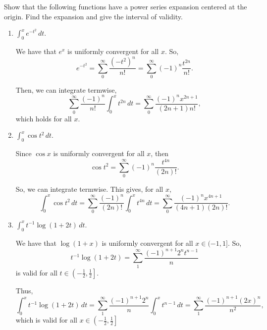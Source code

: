 \documentclass[../hw3]{subfiles}
\begin{document}
\begin{problem}
Show that the following functions have a power series expansion centered at the origin.
Find the expansion and give the interval of validity.
\end{problem}
\begin{enumerate}[label=\alph*)]
	\item $\int_{0}^{x} e^{-t^2} \,dt$.

	      We have that $e^x$ is uniformly convergent for all  $x$.
	      So, \[
		      e^{-t^2}=\sum_{0}^{\infty} \frac{(-t^2)^n}{n!}=\sum_{0}^{\infty} (-1)^n \frac{t^{2n}}{n!}
		      .\]

	      Then, we can integrate termwise, \[
		      \sum_{0}^{\infty} \frac{(-1)^n}{n!}\int_{0}^{x} t^{2n} \,dt = \sum_{0}^{\infty} \frac{(-1)^n x^{2n+1}}{(2n+1)n!}
		      ,\] which holds for all $x$.

	\item $\int_{0}^{x} \cos{t^2}  \,dt$.

	      Since $\cos{x} $ is uniformly convergent for all $x$, then  \[
		      \cos{t^2} = \sum_{0}^{\infty} (-1)^n \frac{t^{4n}}{(2n)!}
		      .\]

	      So, we can integrate termwise.
	      This gives, for all $x$, \[
		      \int_{0}^{x} \cos{t^2}  \,dt = \sum_{0}^{\infty} \frac{(-1)^n}{(2n)!}\int_{0}^{x} t^{4n} \,dt = \sum_{0}^{\infty} \frac{(-1)^nx^{4n+1}}{(4n+1)(2n)!}
		      .\]

	\item $\int_{0}^{x} t^{-1}\log{( 1+2t )} \,dt$.

	      We have that  $\log{( 1+x )}$ is uniformly convergent for all $x \in (-1,1]$.
	      So, \[
		      t^{-1}\log{(1+2t)} = \sum_{1}^{\infty} \frac{(-1)^{n+1} 2^n t^{n-1}}{n}
	      \] is valid for all $t \in \left( -\frac{1}{2},\frac{1}{2}  \right]$.

	      Thus, \[
		      \int_{0}^{x} t^{-1}\log{(1+2t)}  \,dt = \sum_{1}^{\infty} \frac{(-1)^{n+1}2^n}{n}\int_{0}^{x} t^{n-1} \,dt = \sum_{1}^{\infty} \frac{(-1)^{n+1}(2x)^n}{n^2}
		      ,\] which is valid for all $x \in \left( -\frac{1}{2},\frac{1}{2}  \right]$
\end{enumerate}
\end{document}
